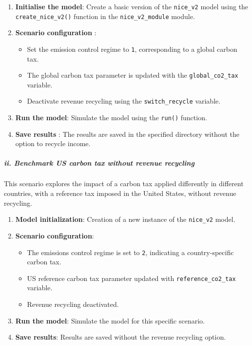 \documentclass[
]{article}
\providecommand{\tightlist}{%
  \setlength{\itemsep}{0pt}\setlength{\parskip}{0pt}}
\begin{document}
\begin{enumerate}
\def\labelenumi{\arabic{enumi}.}
\tightlist
\item
  \textbf{Initialise the model}: Create a basic version of the
  \texttt{nice\_v2} model using the \texttt{create\_nice\_v2()} function
  in the \texttt{nice\_v2\_module} module.
\item
  \textbf{Scenario configuration} :

  \begin{itemize}
  \tightlist
  \item
    Set the emission control regime to \texttt{1}, corresponding to a
    global carbon tax.
  \item
    The global carbon tax parameter is updated with the
    \texttt{global\_co2\_tax} variable.
  \item
    Deactivate revenue recycling using the \texttt{switch\_recycle}
    variable.
  \end{itemize}
\item
  \textbf{Run the model}: Simulate the model using the \texttt{run()}
  function.
\item
  \textbf{Save results} : The results are saved in the specified
  directory without the option to recycle income.
\end{enumerate}

\subparagraph{ii. Benchmark US carbon tax without revenue
recycling}\label{ii.-benchmark-us-carbon-tax-without-revenue-recycling}

This scenario explores the impact of a carbon tax applied differently in
different countries, with a reference tax imposed in the United States,
without revenue recycling.

\begin{enumerate}
\def\labelenumi{\arabic{enumi}.}
\tightlist
\item
  \textbf{Model initialization}: Creation of a new instance of the
  \texttt{nice\_v2} model.
\item
  \textbf{Scenario configuration}:

  \begin{itemize}
  \tightlist
  \item
    The emissions control regime is set to \texttt{2}, indicating a
    country-specific carbon tax.
  \item
    US reference carbon tax parameter updated with
    \texttt{reference\_co2\_tax} variable.
  \item
    Revenue recycling deactivated.
  \end{itemize}
\item
  \textbf{Run the model}: Simulate the model for this specific scenario.
\item
  \textbf{Save results}: Results are saved without the revenue recycling
  option.
\end{enumerate}
\end{document}
